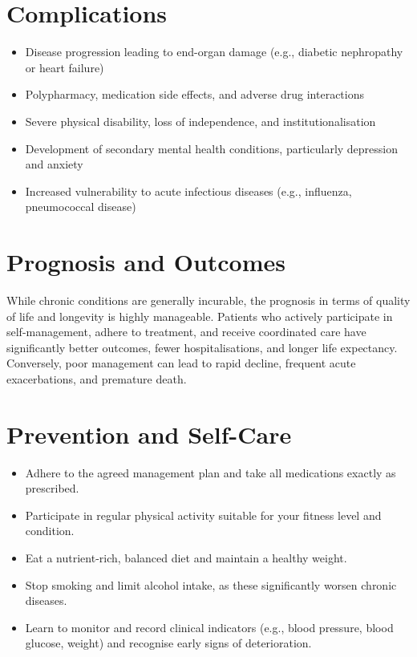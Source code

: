 \section*{Complications}
\begin{itemize}
    \item Disease progression leading to end-organ damage (e.g., diabetic nephropathy or heart failure)
    \item Polypharmacy, medication side effects, and adverse drug interactions
    \item Severe physical disability, loss of independence, and institutionalisation
    \item Development of secondary mental health conditions, particularly depression and anxiety
    \item Increased vulnerability to acute infectious diseases (e.g., influenza, pneumococcal disease)
\end{itemize}

\section*{Prognosis and Outcomes}
While chronic conditions are generally incurable, the prognosis in terms of quality of life and longevity is highly manageable. Patients who actively participate in self-management, adhere to treatment, and receive coordinated care have significantly better outcomes, fewer hospitalisations, and longer life expectancy. Conversely, poor management can lead to rapid decline, frequent acute exacerbations, and premature death.

\section*{Prevention and Self-Care}
\begin{itemize}
    \item Adhere to the agreed management plan and take all medications exactly as prescribed.
    \item Participate in regular physical activity suitable for your fitness level and condition.
    \item Eat a nutrient-rich, balanced diet and maintain a healthy weight.
    \item Stop smoking and limit alcohol intake, as these significantly worsen chronic diseases.
    \item Learn to monitor and record clinical indicators (e.g., blood pressure, blood glucose, weight) and recognise early signs of deterioration.
\end{itemize}

